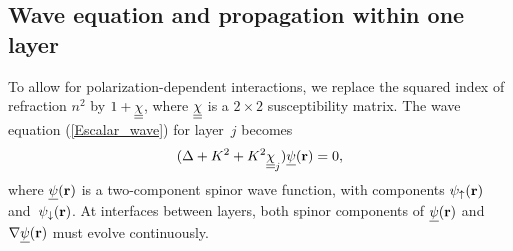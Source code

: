 

\subsection{Wave equation and propagation within one layer}

To allow for polarization-dependent interactions,
we replace the squared index of refraction $n^2$
by $1+\underline{\underline{\chi}}$, where $\underline{\underline{\chi}}$ is a $2\times 2$ susceptibility matrix.
The wave equation (\ref{Escalar_wave}) for layer~$j$ becomes
\begin{equation}\label{Ewaveqp}  
(\Delta +K^2 +K^2 \underline{\underline{\chi}}_j) \underline{\psi}(\mathbf{r})= 0,
\end{equation}
where $\underline{\psi}(\mathbf{r})$ is a two-component spinor wave function,
with components $\psi_\uparrow(\mathbf{r})$ and~$\psi_\downarrow(\mathbf{r})$.
At interfaces between layers,
both spinor components of $\underline{\psi}(\mathbf{r})$ and $\mathbf{\nabla}\underline{\psi}(\mathbf{r})$
must evolve continuously.

